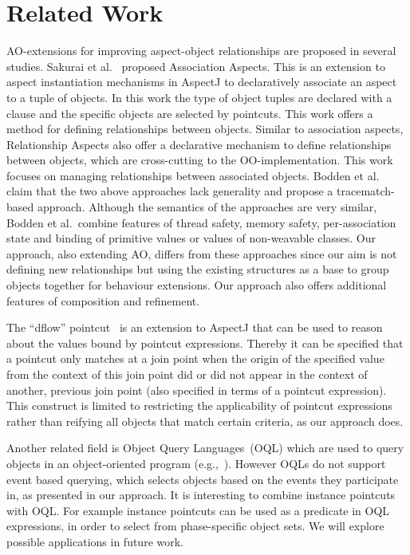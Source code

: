 
\section{Related Work}
AO-extensions for improving aspect-object relationships are proposed in several studies. Sakurai et al.~\cite{sakurai2004association} proposed Association Aspects. This is an extension to aspect instantiation mechanisms in AspectJ to declaratively associate an aspect to a tuple of objects. In this work the type of object tuples are declared with a  clause and the specific objects are selected by pointcuts. This work offers a method for defining relationships between objects. Similar to association aspects, Relationship Aspects \cite{pearce2006relationship} also offer a declarative mechanism to define relationships between objects, which are cross-cutting to the OO-implementation. This work focuses on managing relationships between associated objects. Bodden et al.~\cite{bodden2008relational} claim that the two above approaches lack generality and propose a tracematch-based approach. Although the semantics of the approaches are very similar, Bodden et al.\ combine features of thread safety,
 memory safety, per-association state and binding of primitive values or values of non-weavable classes. Our approach, also extending AO, differs from these approaches since our aim is not defining new relationships but using the existing structures as a base to group objects together for behaviour extensions. Our approach also offers additional features of composition and refinement.

The ``dflow'' pointcut~\cite{kawauchi:aosd-aosdsec04} is an extension to AspectJ that can be used to reason about the values bound by pointcut expressions. Thereby it can be specified that a pointcut only matches at a join point when the origin of the specified value from the context of this join point did or did not appear in the context of another, previous join point (also specified in terms of a pointcut expression). This construct is limited to restricting the applicability of pointcut expressions rather than reifying all objects that match certain criteria, as our approach does.

Another related field is Object Query Languages~(OQL) which are used to query objects in an object-oriented program (e.g.,~\cite{cluet1998designing}). However OQLs do not support event based querying, which selects objects based on the events they participate in, as presented in our approach. It is interesting to combine instance pointcuts with OQL. For example instance pointcuts can be used as a predicate in OQL expressions, in order to select from phase-specific object sets. We will explore possible applications in future work.

